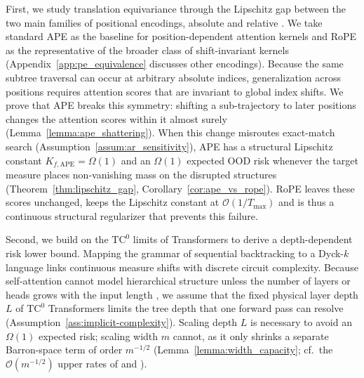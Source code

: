 \documentclass{article}
\begin{document}
First, we study translation equivariance through the Lipschitz gap between the two main families of positional encodings, absolute and relative \citep{zhao2024lengthextrapolationtransformerssurvey}. We take standard APE as the baseline for position-dependent attention kernels and RoPE \citep{su2023roformerenhancedtransformerrotary} as the representative of the broader class of shift-invariant kernels (Appendix~\ref{app:pe_equivalence} discusses other encodings).
Because the same subtree traversal can occur at arbitrary absolute indices, generalization across positions requires attention scores that are invariant to global index shifts.
We prove that APE breaks this symmetry: shifting a sub-trajectory to later positions changes the attention scores within it almost surely (Lemma~\ref{lemma:ape_shattering}). When this change misroutes exact-match search (Assumption~\ref{assum:ar_sensitivity}), APE has a structural Lipschitz constant $K_{f, \mathrm{APE}} = \Omega(1)$ and an $\Omega(1)$ expected OOD risk whenever the target measure places non-vanishing mass on the disrupted structures (Theorem~\ref{thm:lipschitz_gap}, Corollary~\ref{cor:ape_vs_rope}). %
 RoPE leaves these scores unchanged, keeps the Lipschitz constant at $\mathcal{O}(1/T_{\max})$ and is thus a continuous structural regularizer that prevents this failure.

Second, we build on the $\text{TC}^0$ limits of Transformers \citep{merrill2023parallelismtradeofflimitationslogprecision} to derive a depth-dependent risk lower bound. Mapping the grammar of sequential backtracking to a Dyck-$k$ language links continuous measure shifts with discrete circuit complexity. Because self-attention cannot model hierarchical structure unless the number of layers or heads grows with the input length \citep{Hahn_2020}, we assume that the fixed physical layer depth $L$ of $\text{TC}^0$ Transformers limits the tree depth that one forward pass can resolve (Assumption~\ref{ass:implicit-complexity}). %
 Scaling depth $L$ is necessary to avoid an $\Omega(1)$ expected risk; scaling width $m$ cannot, as it only shrinks a separate Barron-space term of order $m^{-1/2}$ (Lemma~\ref{lemma:width_capacity}; cf.\ the $\mathcal{O}(m^{-1/2})$ upper rates of \citet{Barron1993} and \citet{MAKOVOZ199698}). %
\end{document}

